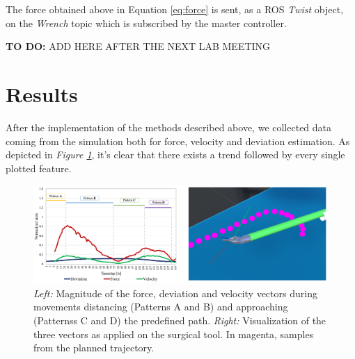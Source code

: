 \documentclass[conference]{IEEEtran}
\begin{document}
    The force obtained above in Equation \ref{eq:force} is sent, as a ROS
    \textit{Twist} object, on the \textit{Wrench} topic which is
    subscribed by the master controller.

    \textbf{TO DO:} ADD HERE AFTER THE NEXT LAB MEETING
\section{Results}
    After the implementation of the methods described above, we collected
    data coming from the simulation both for force, velocity and deviation
    estimation. As depicted in   \textit{Figure \ref{fig:plots}}, it’s
    clear that there exists a trend followed by every single plotted
    feature.

    \begin{figure}
        \centering
        \includegraphics[width=\linewidth]{plotandee.png}
        \caption{\textit{Left:} Magnitude of the force, deviation and
        velocity vectors during movements distancing (Patterns A and B)
        and approaching (Patternss C and D) the predefined path.
        \textit{Right:} Visualization of the three vectors as applied on
        the surgical tool. In magenta, samples from the planned
        trajectory.}
        \label{fig:plots}
    \end{figure}
\end{document}
